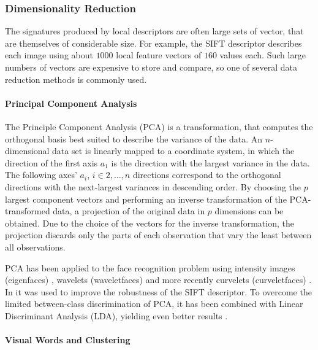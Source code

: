 \subsubsection{Dimensionality Reduction}

The signatures produced by local descriptors are often large sets of vector,
that are themselves of considerable size. For example, the SIFT descriptor
describes each image using about $1000$ local feature vectors of $160$ values
each. Such large numbers of vectors are expensive to store and compare, so one
of several data reduction methods is commonly used.

\paragraph{Principal Component Analysis}

The Principle Component Analysis (PCA) is a transformation, that computes the
orthogonal basis best suited to describe the variance of the data. An
$n$-dimensional data set is linearly mapped to a coordinate system, in which
the direction of the first axis $a_1$ is the direction with the largest
variance in the data. The following axes' $a_i$, $i \in 2, \dots, n$ directions
correspond to the orthogonal directions with the next-largest variances in
descending order. By choosing the $p$ largest component vectors and performing
an inverse transformation of the PCA-transformed data, a projection of the
original data in $p$ dimensions can be obtained. Due to the choice of the
vectors for the inverse transformation, the projection discards only the parts
of each observation that vary the least between all observations.

PCA has been applied to the face recognition problem using intensity images
(eigenfaces) \autocite{turk_face_1991}, wavelets (waveletfaces)
\autocite{feng_human_2000} and more recently curvelets (curveletfaces)
\autocite{mandal_face_2008}. In \autocite{ke_pca-sift:_2004} it was used to
improve the robustness of the SIFT \autocite{lowe_object_1999} descriptor. To
overcome the limited between-class discrimination of PCA, it has been combined
with Linear Discriminant Analysis (LDA), yielding even better results
\autocite{mandal_curvelet_2009}.

\paragraph{Visual Words and Clustering}\label{sec:anatomy_clustering}

